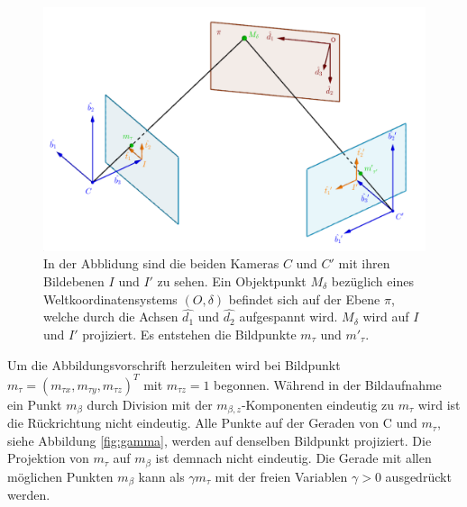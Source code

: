 \begin{figure}[!htb]
	\centering
	\includegraphics[width=0.8\linewidth]{images/HomographieDP_beschriftet.png}
	\caption[Abbildungsvorschrift in Homographien]{In der Abblidung sind die beiden Kameras $C$ und $C'$ mit ihren Bildebenen $I$ und $I'$ zu sehen. Ein Objektpunkt $M_\delta$ bezüglich eines Weltkoordinatensystems $(O,\delta)$ befindet sich auf der Ebene $\pi$, welche durch die Achsen $\hat{d_1}$ und $\hat{d_2}$ aufgespannt wird. $M_\delta$ wird auf $I$ und $I'$ projiziert. Es entstehen die Bildpunkte $m_\tau$ und $m'_\tau$.}  
	\label{fig:Homographie}
\end{figure}


Um die Abbildungsvorschrift herzuleiten wird bei  Bildpunkt \ensuremath{m_{\tau} = (m_{\tau x},m_{\tau y},m_{\tau z})^T} mit $m_{\tau z}=1$ begonnen. Während in der Bildaufnahme ein Punkt $m_\beta$ durch Division mit der $m_{\beta,z}$-Komponenten eindeutig zu $m_{\tau}$ wird ist die Rückrichtung nicht eindeutig. Alle Punkte auf der Geraden von C und $m_{\tau}$, siehe Abbildung \ref{fig:gamma}, werden auf denselben Bildpunkt projiziert. Die Projektion von $m_{\tau}$ auf $m_\beta$ ist demnach nicht eindeutig. Die Gerade mit allen möglichen Punkten $m_\beta$ kann als $\gamma m_{\tau}$ mit der freien Variablen $\gamma > 0$ ausgedrückt werden.  



